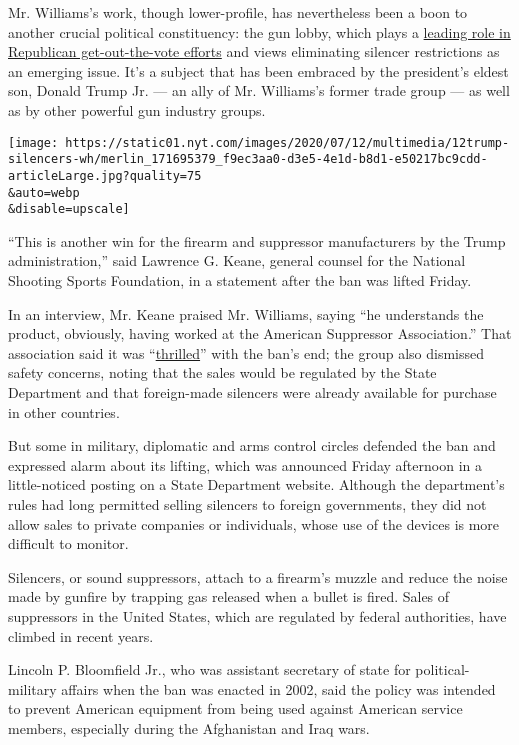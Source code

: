 Mr. Williams's work, though lower-profile, has nevertheless been a boon
to another crucial political constituency: the gun lobby, which plays a
\href{https://www.nytimes.com/2018/02/24/us/politics/nra-gun-control-florida.html}{leading
role in Republican get-out-the-vote efforts} and views eliminating
silencer restrictions as an emerging issue. It's a subject that has been
embraced by the president's eldest son, Donald Trump Jr. --- an ally of
Mr. Williams's former trade group --- as well as by other powerful gun
industry groups.

\texttt{[image: https://static01.nyt.com/images/2020/07/12/multimedia/12trump-silencers-wh/merlin\_171695379\_f9ec3aa0-d3e5-4e1d-b8d1-e50217bc9cdd-articleLarge.jpg?quality=75\\\&auto=webp\\\&disable=upscale]}

``This is another win for the firearm and suppressor manufacturers by
the Trump administration,'' said Lawrence G. Keane, general counsel for
the National Shooting Sports Foundation, in a statement after the ban
was lifted Friday.

In an interview, Mr. Keane praised Mr. Williams, saying ``he understands
the product, obviously, having worked at the American Suppressor
Association.'' That association said it was
``\href{https://americansuppressorassociation.com/suppressor-exportation-now-legal/}{thrilled}''
with the ban's end; the group also dismissed safety concerns, noting
that the sales would be regulated by the State Department and that
foreign-made silencers were already available for purchase in other
countries.

But some in military, diplomatic and arms control circles defended the
ban and expressed alarm about its lifting, which was announced Friday
afternoon in a little-noticed posting on a State Department website.
Although the department's rules had long permitted selling silencers to
foreign governments, they did not allow sales to private companies or
individuals, whose use of the devices is more difficult to monitor.

Silencers, or sound suppressors, attach to a firearm's muzzle and reduce
the noise made by gunfire by trapping gas released when a bullet is
fired. Sales of suppressors in the United States, which are regulated by
federal authorities, have climbed in recent years.

Lincoln P. Bloomfield Jr., who was assistant secretary of state for
political-military affairs when the ban was enacted in 2002, said the
policy was intended to prevent American equipment from being used
against American service members, especially during the Afghanistan and
Iraq wars.

